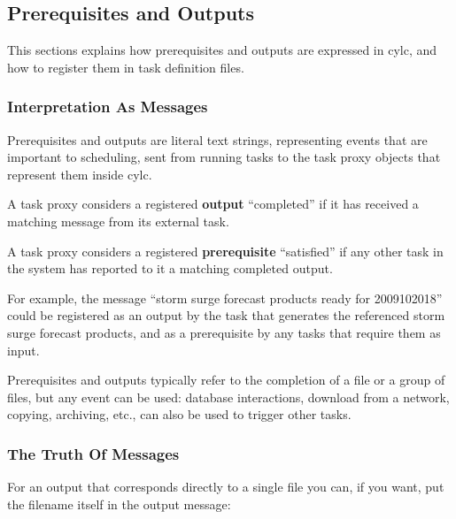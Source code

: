 \documentclass[11pt,a4paper]{article}
\begin{document}
\pagebreak
\subsection{Prerequisites and Outputs} 
\label{PrerequisitesandOutputs}


This sections explains how prerequisites and outputs are expressed in
cylc, and how to register them in task definition files.

\subsubsection{Interpretation As Messages} 

\begin{shaded}
    Prerequisites and outputs are literal text strings, representing
    events that are important to scheduling, sent from running tasks
    to the  task proxy objects that represent them inside cylc.
\end{shaded}

A task proxy considers a registered {\bf output} ``completed'' if it has
received a matching message from its external task.

A task proxy considers a registered {\bf prerequisite} ``satisfied'' if
any other task in the system has reported to it a matching completed
output.

For example, the message ``storm surge forecast products ready for
2009102018'' could be registered as an output by the task that generates
the referenced storm surge forecast products, and as a prerequisite by
any tasks that require them as input. 

Prerequisites and outputs typically refer to the completion of a file
or a group of files, but any event can be used: database interactions,
download from a network, copying, archiving, etc., can also be
used to trigger other tasks.

\subsubsection{The Truth Of Messages}

For an output that corresponds directly to a single file you can, if
you want, put the filename itself in the output message:
\end{document}

